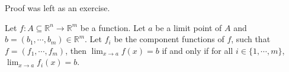 Proof was left as an exercise.

\begin{theorem}
    Let $f : A \subseteq \mathbb{R}^n \to \mathbb{R}^m$ be a function. Let $a$ be a limit point of $A$ and $b = (b_1, \cdots, b_m) \in \mathbb{R}^m$. Let $f_i$ be the component functions of $f$, such that $f = (f_1, \cdots, f_m)$, then $\displaystyle \lim_{ x \to a } f(x) = b$ if and only if for all $i \in \{ 1, \cdots, m \}$, $\displaystyle \lim_{ x \to a } f_i(x) = b$.
\end{theorem}
